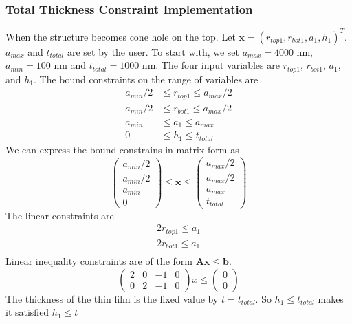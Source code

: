 \documentclass[12pt]{article}
\numberwithin{equation}{section}
\numberwithin{equation}{section}
\begin{document}
\subsubsection{Total Thickness Constraint Implementation}
When the structure becomes cone hole on the top. Let $\mathbf{x} = \left ( r_{top1}, r_{bot1}, a_1, h_1  \right )^T $.$a_{max}$ and $t_{total}$ are set by the user.  To start with, we set $a_{max} = 4000$ nm, $a_{min} = 100$ nm and $t_{total} = 1000$ nm. The four input variables are $r_{top1}$, $r_{bot1}$, $a_1$, and $h_1$. The bound constraints on the range of variables are
\begin{align*}
a_{min}/2 & \leq r_{top1} \leq a_{max}/2 \\
a_{min}/2 & \leq r_{bot1} \leq a_{max}/2 \\
a_{min} & \leq a_{1} \leq a_{max} \\
0 & \leq h_1 \leq t_{total}
\end{align*}
We can express the bound constrains in matrix form as
\begin{equation}
\left(
\begin{matrix}
a_{min}/2\\ 
a_{min}/2\\
a_{min}\\ 
0
\end{matrix} \right )
\leq \mathbf{x}
 \leq 
 \left(
\begin{matrix}
a_{max}/2 \\ a_{max}/2 \\ a_{max}  \\ t_{total} 
\end{matrix} \right )
\end{equation}
The linear constraints are 
\begin{align*}   
2r_{top1} \leq a_1 \\
2r_{bot1} \leq a_1 \\
\end{align*}
Linear inequality constraints are of the form $\mathbf{A} \mathbf{x} \leq \mathbf{b}$.
\begin{equation}
\left(
\begin{matrix}
2 & 0 & -1 & 0 \\
0 & 2 & -1 & 0 

\end{matrix}
\right ) x  \leq \left ( \begin{matrix} 0\\ 0   \end{matrix} \right ) 
\end{equation}
The thickness of the thin film is the fixed value by $t=t_{total}$. So $h_1 \leq t_{total}$ makes it satisfied $h_1 \leq t$ \\
\end{document}
